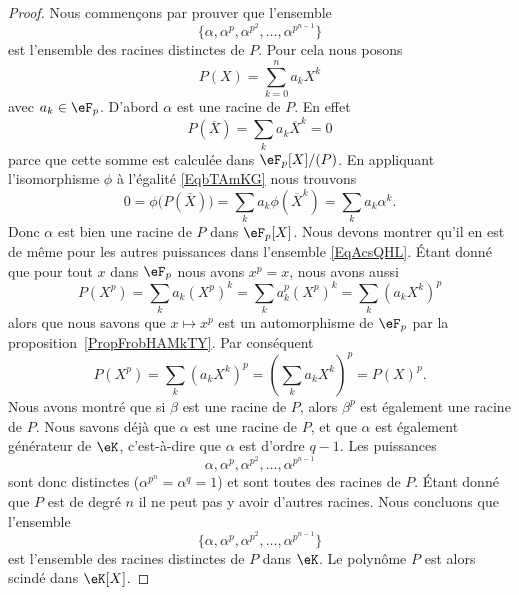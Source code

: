 \begin{proof}
	Nous commençons par prouver que l'ensemble
	\begin{equation}        \label{EqAcsQHL}
		\{ \alpha,\alpha^p,\alpha^{p^2},\ldots, \alpha^{p^{n-1}} \}
	\end{equation}
	est l'ensemble des racines distinctes de \( P\). Pour cela nous posons
	\begin{equation}
		P(X)=\sum_{k=0}^na_kX^k
	\end{equation}
	avec \( a_k\in\eF_p\). D'abord \( \alpha\) est une racine de \( P\). En effet
	\begin{equation}        \label{EqbTAmKG}
		P(\overline X)=\sum_ka_k\overline X^k=0
	\end{equation}
	parce que cette somme est calculée dans \( \eF_p[X]/(P)\). En appliquant l'isomorphisme \( \phi\) à l'égalité \eqref{EqbTAmKG} nous trouvons
	\begin{equation}
		0=\phi\big( P(\overline X) \big)=\sum_ka_k\phi(\overline X^k)=\sum_ka_k\alpha^k.
	\end{equation}
	Donc \( \alpha\) est bien une racine de \( P\) dans \( \eF_p[X]\). Nous devons montrer qu'il en est de même pour les autres puissances dans l'ensemble \eqref{EqAcsQHL}. Étant donné que pour tout \( x\) dans \( \eF_p\) nous avons \( x^p=x\), nous avons aussi
	\begin{equation}
		P(X^p)=\sum_ka_k(X^p)^k=\sum_ka_k^p(X^p)^k=\sum_k(a_kX^k)^p
	\end{equation}
	alors que nous savons que \( x\mapsto x^p\) est un automorphisme de \( \eF_p\) par la proposition~\ref{PropFrobHAMkTY}. Par conséquent
	\begin{equation}
		P(X^p)=\sum_k(a_kX^k)^p=\left( \sum_k a_kX^k\right)^p=P(X)^p.
	\end{equation}
	Nous avons montré que si \( \beta\) est une racine de \( P\), alors \( \beta^p\) est également une racine de \( P\). Nous savons déjà que \( \alpha\) est une racine de \( P\), et que \( \alpha\) est également générateur de \( \eK\), c'est-à-dire que \( \alpha\) est d'ordre \( q-1\). Les puissances
	\begin{equation}
		\alpha,\alpha^p,\alpha^{p^2},\ldots, \alpha^{p^{n-1}}
	\end{equation}
	sont donc distinctes (\( \alpha^{p^n}=\alpha^q=1\)) et sont toutes des racines de \( P\). Étant donné que \( P\) est de degré \( n\) il ne peut pas y avoir d'autres racines. Nous concluons que l'ensemble
	\begin{equation}
		\{ \alpha,\alpha^p,\alpha^{p^2},\ldots, \alpha^{p^{n-1}}\}
	\end{equation}
	est l'ensemble des racines distinctes de \( P\) dans \( \eK\). Le polynôme \( P\) est alors scindé dans \( \eK[X]\).


\end{proof}

